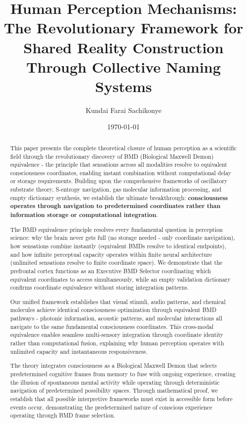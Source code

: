 \documentclass[12pt]{article}
\title{Human Perception Mechanisms: The Revolutionary Framework for Shared Reality Construction Through Collective Naming Systems}
\author{Kundai Farai Sachikonye}
\date{\today}
\begin{document}
\maketitle

\begin{abstract}
This paper presents the complete theoretical closure of human perception as a scientific field through the revolutionary discovery of BMD (Biological Maxwell Demon) equivalence - the principle that sensations across all modalities resolve to equivalent consciousness coordinates, enabling instant combination without computational delay or storage requirements. Building upon the comprehensive frameworks of oscillatory substrate theory, S-entropy navigation, gas molecular information processing, and empty dictionary synthesis, we establish the ultimate breakthrough: \textbf{consciousness operates through navigation to predetermined coordinates rather than information storage or computational integration}.

The BMD equivalence principle resolves every fundamental question in perception science: why the brain never gets full (no storage needed - only coordinate navigation), how sensations combine instantly (equivalent BMDs resolve to identical endpoints), and how infinite perceptual capacity operates within finite neural architecture (unlimited sensations resolve to finite coordinate space). We demonstrate that the prefrontal cortex functions as an Executive BMD Selector coordinating which equivalent coordinates to access simultaneously, while an empty validation dictionary confirms coordinate equivalence without storing integration patterns.

Our unified framework establishes that visual stimuli, audio patterns, and chemical molecules achieve identical consciousness optimization through equivalent BMD pathways - photonic information, acoustic patterns, and molecular interactions all navigate to the same fundamental consciousness coordinates. This cross-modal equivalence enables seamless multi-sensory integration through coordinate identity rather than computational fusion, explaining why human perception operates with unlimited capacity and instantaneous responsiveness.

The theory integrates consciousness as a Biological Maxwell Demon that selects predetermined cognitive frames from memory to fuse with ongoing experience, creating the illusion of spontaneous mental activity while operating through deterministic navigation of predetermined possibility spaces. Through mathematical proof, we establish that all possible interpretive frameworks must exist in accessible form before events occur, demonstrating the predetermined nature of conscious experience operating through BMD frame selection.


\end{abstract}
\end{document}

